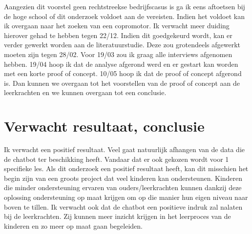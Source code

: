 Aangezien dit voorstel geen rechtstreekse bedrijfscasus is ga ik eens aftoetsen bij de hoge school of dit onderzoek voldoet aan de vereisten. 
Indien het voldoet kan ik overgaan naar het zoeken van een copromotor. 
Ik verwacht meer duiding hierover gehad te hebben tegen 22/12. 
Indien dit goedgekeurd wordt, kan er verder gewerkt worden aan de literatuurstudie. 
Deze zou grotendeels afgewerkt moeten zijn tegen 28/02. 
Voor 19/03 zou ik graag alle interviews afgenomen hebben. 
19/04 hoop ik dat de analyse afgerond werd en er gestart kan worden met een korte proof of concept. 
10/05 hoop ik dat de proof of concept afgerond is. 
Dan kunnen we overgaan tot het voorstellen van de proof of concept aan de leerkrachten en we kunnen overgaan tot een conclusie. 

\section{Verwacht resultaat, conclusie}%
\label{sec:verwachte_resultaten}

Ik verwacht een positief resultaat. Veel gaat natuurlijk afhangen van de data die de chatbot ter beschikking heeft. Vandaar dat er ook gekozen wordt voor 1 specifieke les. Als dit onderzoek een positief resultaat heeft, kan dit misschien het begin zijn van een groots project dat veel kinderen kan ondersteunen. Kinderen die minder ondersteuning ervaren van ouders/leerkrachten kunnen dankzij deze oplossing ondersteuning op maat krijgen om op die manier hun eigen niveau naar boven te tillen. Ik verwacht ook dat de chatbot een positieve indruk zal nalaten bij de leerkrachten. Zij kunnen meer inzicht krijgen in het leerproces van de kinderen en zo meer op maat gaan begeleiden. 

